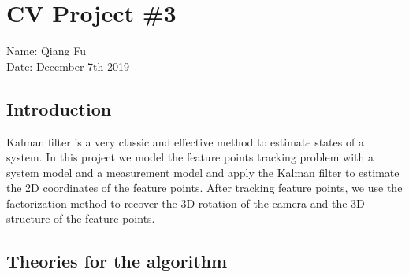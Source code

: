 \documentclass{article}
\begin{document}
\section*{CV Project \#3}
Name: Qiang Fu
\\Date: December 7th 2019

\subsection*{Introduction} 
Kalman filter is a very classic and effective method to estimate states of a system. In this project we model the feature points tracking problem with a system model and a measurement model and apply the Kalman filter to estimate the 2D coordinates of the feature points. After tracking feature points, we use the factorization method to recover the 3D rotation of the camera and the 3D structure of the feature points.
\subsection*{Theories for the algorithm}
\end{document}
